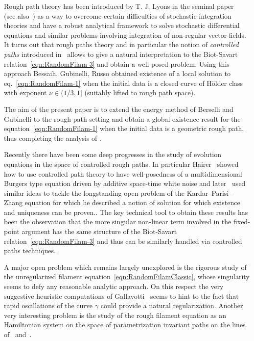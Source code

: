 \documentclass[11pt,a4paper,reqno]{amsart}%
\theoremstyle{plain}
\theoremstyle{remark}
\theoremstyle{plain}
\numberwithin{equation}{section}
\begin{document}
Rough path theory has been introduced by T. J. Lyons in the seminal paper~\cite{[Lyons-1998]} (see also~\cites{[LyonsQian-2002],[LionsStFlour],[FrizVictoir]}) as a way to overcome certain difficulties of stochastic integration theories and have a robust analytical framework to solve stochastic differential equations and similar problems involving integration of non-regular vector-fields.
It turns out that rough paths theory and in particular the notion of \emph{controlled paths} introduced in~\cite{[Gubinelli-2004]} allows to give a natural interpretation to the Biot-Savart relation~\eqref{eqn:RandomFilam-3} and obtain a well-posed problem. Using this approach  Bessaih, Gubinelli, Russo \cite{[Bess+Gub_2005]}  obtained existence of a local solution to  eq.~\eqref{eqn:RandomFilam-1} when the initial data is a closed curve of
H\"{o}lder class with exponent $\nu\in ({1}/{3},1]$ (suitably lifted to rough path space).

The aim of the present paper is to extend the energy method of Berselli and Gubinelli to the rough path setting and obtain  a global existence result for the equation~\eqref{eqn:RandomFilam-1}  when the  initial data is a geometric rough path, thus completing the analysis of \cite{[Bess+Gub_2005]}.

Recently there have been some deep progresses in the study of evolution equations in the space of controlled rough paths. In particular Hairer~\cite{Hairer} showed how to use controlled path theory to have well-posedness of a multidimensional Burgers type equation driven by additive space-time white noise and later~\cite{KPZ} used similar ideas to tackle the longstanding open problem of the Kardar--Parisi--Zhang equation for which he described a notion of solution for which existence and uniqueness can be proven.. The key technical tool to obtain these results has been the observation that the more singular non-linear term involved in the fixed-point argument has the same structure of the Biot-Savart relation~\eqref{eqn:RandomFilam-3} and thus can be similarly handled via controlled paths techniques.

A major open problem which remains largely unexplored is the rigorous study of the unregularized filament equation~\eqref{eqn:RandomFilamClassic}, whose singularity seems to defy any reasonable analytic approach. On this respect the very suggestive heuristic computations of Gallavotti~\cite{Gallavotti} seems to hint to the fact that rapid oscillations of the curve $\gamma$ could provide a natural regularization. Another very interesting problem is the study of the rough filament equation as an Hamiltonian system on the space of parametrization invariant paths on the lines of~\cite{arnold_topological_1998} and~\cite{[Brylinski-1992]}.
\end{document}
